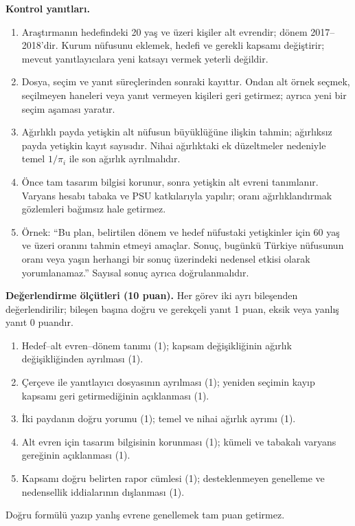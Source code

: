 \textbf{Kontrol yanıtları.}
\begin{enumerate}
\item Araştırmanın hedefindeki 20 yaş ve üzeri kişiler alt evrendir;
dönem 2017--2018'dir. Kurum nüfusunu eklemek, hedefi ve gerekli kapsamı
değiştirir; mevcut yanıtlayıcılara yeni katsayı vermek yeterli değildir.
\item Dosya, seçim ve yanıt süreçlerinden sonraki kayıttır. Ondan
alt örnek seçmek, seçilmeyen haneleri veya yanıt vermeyen kişileri
geri getirmez; ayrıca yeni bir seçim aşaması yaratır.
\item Ağırlıklı payda yetişkin alt nüfusun büyüklüğüne ilişkin tahmin;
ağırlıksız payda yetişkin kayıt sayısıdır. Nihai ağırlıktaki ek
düzeltmeler nedeniyle temel $1/\pi_i$ ile son ağırlık ayrılmalıdır.
\item Önce tam tasarım bilgisi korunur, sonra yetişkin alt evreni
tanımlanır. Varyans hesabı tabaka ve PSU katkılarıyla yapılır; oranı
ağırlıklandırmak gözlemleri bağımsız hale getirmez.
\item Örnek: ``Bu plan, belirtilen dönem ve hedef nüfustaki yetişkinler
için 60 yaş ve üzeri oranını tahmin etmeyi amaçlar. Sonuç, bugünkü
Türkiye nüfusunun oranı veya yaşın herhangi bir sonuç üzerindeki
nedensel etkisi olarak yorumlanamaz.'' Sayısal sonuç ayrıca doğrulanmalıdır.
\end{enumerate}

\textbf{Değerlendirme ölçütleri (10 puan).} Her görev iki ayrı
bileşenden değerlendirilir; bileşen başına doğru ve gerekçeli yanıt
1 puan, eksik veya yanlış yanıt 0 puandır.
\begin{enumerate}
\item Hedef--alt evren--dönem tanımı (1); kapsam değişikliğinin
ağırlık değişikliğinden ayrılması (1).
\item Çerçeve ile yanıtlayıcı dosyasının ayrılması (1); yeniden
seçimin kayıp kapsamı geri getirmediğinin açıklanması (1).
\item İki paydanın doğru yorumu (1); temel ve nihai ağırlık ayrımı (1).
\item Alt evren için tasarım bilgisinin korunması (1); kümeli ve
tabakalı varyans gereğinin açıklanması (1).
\item Kapsamı doğru belirten rapor cümlesi (1); desteklenmeyen
genelleme ve nedensellik iddialarının dışlanması (1).
\end{enumerate}
Doğru formülü yazıp yanlış evrene genellemek tam puan getirmez.

